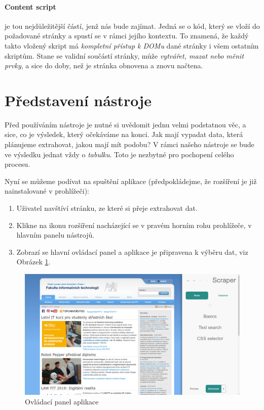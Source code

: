 \documentclass[thesis=B,czech]{FITthesis}[2012/06/26]
\begin{document}
\paragraph{Content script}\label{def:content_script} je tou nejdůležitější částí, jenž nás bude zajímat. Jedná se o kód, který se vloží do požadované stránky a spustí se v rámci jejího kontextu. To znamená, že každý takto vložený skript má \emph{kompletní přístup k DOMu} dané stránky i všem ostatním skriptům. Stane se validní součástí stránky, může \emph{vytvářet, mazat nebo měnit prvky}, a sice do doby, než je stránka obnovena a znovu načtena.

\section{Představení nástroje}
Před používáním nástroje je nutné si uvědomit jednu velmi podstatnou věc, a sice, co je výsledek, který očekáváme na konci. Jak mají vypadat data, která plánujeme extrahovat, jakou mají mít podobu? V rámci našeho nástroje se bude ve výsledku jednat vždy o \emph{tabulku}. Toto je nezbytné pro pochopení celého procesu.

Nyní se můžeme podívat na spuštění aplikace (předpokládejme, že rozšíření je již nainstalované v prohlížeči):
\begin{enumerate}
	\item Uživatel navštíví stránku, ze které si přeje extrahovat dat.
	\item Klikne na ikonu rozšíření nacházející se v pravém horním rohu prohlížeče, v hlavním panelu nástrojů.
	\item Zobrazí se hlavní ovládací panel a aplikace je připravena k výběru dat, viz Obrázek \ref{fig:scraper_control_panel}.
\end{enumerate}
\begin{figure}[h]
	\includegraphics[width=\linewidth]{images/Scraper_control_panel.png}
	\caption{Ovládací panel aplikace}
	\label{fig:scraper_control_panel}
\end{figure}
\end{document}
